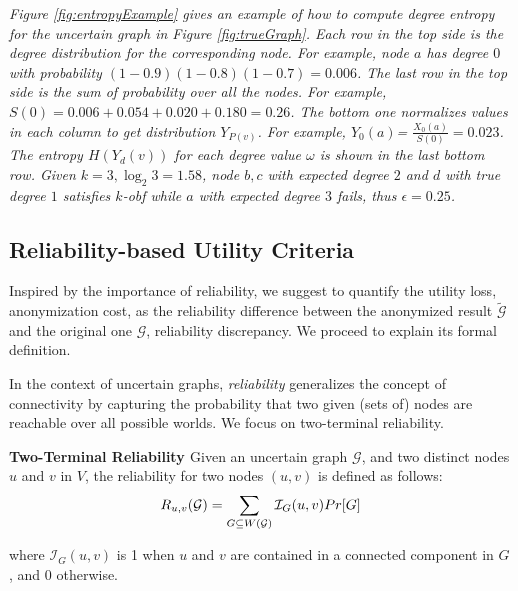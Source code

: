 {\emph{Figure \ref{fig:entropyExample}  gives an example of how to compute degree entropy for the uncertain graph in Figure \ref{fig:trueGraph}. Each row in the top side is the degree distribution for the corresponding node. For example, node $a$ has degree $0$ with probability $(1-0.9)(1-0.8)(1-0.7)=0.006$. The last row in the top side is the sum of probability over all the nodes. For example, $S(0)=0.006+0.054+0.020+0.180=0.26$.
The bottom one normalizes values in each column to get distribution $Y_{P(v)}$. For example, $Y_{0}(a)$= $\frac{X_{0}(a)}{S(0)}=0.023$. The entropy $H(Y_d(v))$ for each degree value $\omega$ is shown in the last bottom row. Given $k=3, \log_{2}{3}=1.58$, node $b,c$ with expected degree $2$ and $d$ with true degree $1$ satisfies $k$-obf while $a$ with expected degree $3$ fails, thus $\epsilon=0.25$.}

\subsection{Reliability-based Utility Criteria}
Inspired by the importance of reliability, we suggest to quantify the utility loss, anonymization cost, as the reliability difference between the anonymized result $\tilde{\mathcal{G}}$ and the original one $\mathcal{G}$, reliability discrepancy. We proceed to explain its formal definition. 

In the context of uncertain graphs, \emph{reliability} generalizes the concept of connectivity by  capturing the probability that two given (sets of) nodes are reachable over all possible worlds. We focus on two-terminal reliability. 
\begin{definition}
    \textbf{Two-Terminal Reliability \cite{Colbourn_Colbourn_1987}}  Given an uncertain graph $\mathcal{G}$, and two distinct nodes $u$ and $v$ in $V$, the reliability for two nodes $(u,v)$ is defined as follows:
        \vj
        \begin{equation*}
                R_{u,v}(\mathcal{G})= \sum_{G \subseteq W(\mathcal{G})}  \mathcal{I}_{G}(u,v) Pr[G] 
        \svj
        \end{equation*}
     
    where $\mathcal{I}_{G}(u,v)$ is 1 when $u$ and $v$ are contained in a connected component in $G$, and 0 otherwise.     
    \label{d:reliability}
\end{definition}

}
